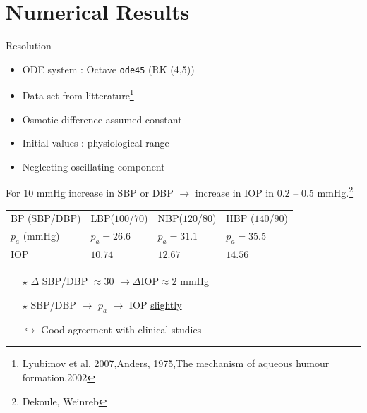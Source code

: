 \section{Numerical Results}
\frame{\sectionpage}
\begin{frame}{Resolution}
\begin{itemize}
\item ODE system : Octave \texttt{ode45} (RK (4,5))
\item Data set from litterature\footnote{Lyubimov et al, 2007,Anders, 1975,The mechanism of aqueous humour formation,2002}
\item Osmotic difference assumed constant
\item Initial values : physiological range
\item Neglecting oscillating component
\end{itemize}

\end{frame}
\begin{frame}

\end{frame}
\begin{frame}
\alert{For $10$ mmHg increase in SBP or DBP $\rightarrow$ increase in IOP in $0.2$ -- $0.5$ mmHg.}\footnote{Dekoule, Weinreb}
\bigskip


\begin{tabular}{|l|l|l|l|}
\hline
BP (SBP/DBP)& LBP($100$/$70$)&NBP($120$/$80$) & HBP ($140$/$90$)\\
$p_a$ (mmHg)& $p_a = 26.6$ & $p_a = 31.1$ & $p_a = 35.5$\\
\hline
IOP & $10.74$ & $12.67$ & $14.56$\\
\hline
\end{tabular}
\bigskip
\begin{itemize}
\item[$\star$] $\Delta$ SBP/DBP $\approx 30$ $\rightarrow \Delta$IOP$\approx 2$ mmHg\\

\item[$\star$]SBP/DBP $\rightarrow$ $p_a$ $\rightarrow$ IOP \underline{slightly}\\

\item[$\hookrightarrow$] Good agreement with clinical studies
\end{itemize}

\end{frame}
